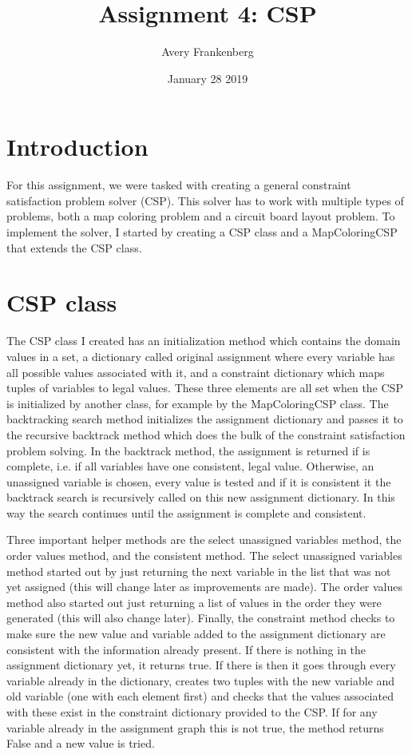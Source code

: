 \documentclass{article}
\title{Assignment 4: CSP}
\author{Avery Frankenberg}
\date{January 28 2019}
\begin{document}
\maketitle

\section{Introduction}
For this assignment, we were tasked with creating a general constraint satisfaction problem solver (CSP). This solver has to work with multiple types of problems, both a map coloring problem and a circuit board layout problem. To implement the solver, I started by creating a CSP class and a MapColoringCSP that extends the CSP class.

\section{CSP class}
The CSP class I created has an initialization method which contains the domain values in a set, a dictionary called original assignment where every variable has all possible values associated with it, and a constraint dictionary which maps tuples of variables to legal values. These three elements are all set when the CSP is initialized by another class, for example by the MapColoringCSP class. The backtracking search method initializes the assignment dictionary and passes it to the recursive backtrack method which does the bulk of the constraint satisfaction problem solving. In the backtrack method, the assignment is returned if is complete, i.e. if all variables have one consistent, legal value. Otherwise, an unassigned variable is chosen, every value is tested and if it is consistent it the backtrack search is recursively called on this new assignment dictionary. In this way the search continues until the assignment is complete and consistent. 

Three important helper methods are the select unassigned variables method, the order values method, and the consistent method. The select unassigned variables method started out by just returning the next variable in the list that was not yet assigned (this will change later as improvements are made). The order values method also started out just returning a list of values in the order they were generated (this will also change later). Finally, the constraint method checks to make sure the new value and variable added to the assignment dictionary are consistent with the information already present. If there is nothing in the assignment dictionary yet, it returns true. If there is then it goes through every variable already in the dictionary, creates two tuples with the new variable and old variable (one with each element first) and checks that the values associated with these exist in the constraint dictionary provided to the CSP. If for any variable already in the assignment graph this is not true, the method returns False and a new value is tried. 
\end{document}
